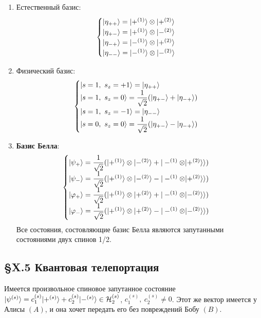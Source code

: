 \begin{enumerate}
	\item Естественный базис:
	\[
	\begin{cases}
		| \eta_{++} \rangle = | +^{(1)} \rangle\otimes| +^{(2)} \rangle\\
		| \eta_{+-} \rangle = | +^{(1)} \rangle\otimes| -^{(2)} \rangle\\
		| \eta_{-+} \rangle = | -^{(1)} \rangle\otimes| +^{(2)} \rangle\\
		| \eta_{--} \rangle = | -^{(1)} \rangle\otimes| -^{(2)} \rangle\\
	\end{cases}
	\]
	\item Физический базис: 
	\[
	\begin{cases}
		| s=1,~s_z=+1 \rangle = | \eta_{++} \rangle\\
		| s=1,~s_z=0 \rangle = \dfrac{1}{\sqrt{2}}(| \eta_{+-} \rangle + | \eta_{-+} \rangle)\\
		| s=1,~s_z=-1 \rangle = | \eta_{--} \rangle\\
		| s=0,~s_z=0 \rangle = \dfrac{1}{\sqrt{2}}(| \eta_{+-} \rangle - | \eta_{-+} \rangle)\\
	\end{cases}
	\]
	\item \textbf{Базис Белла}:
	\[
	\begin{cases}
		| \psi_+ \rangle = \dfrac{1}{\sqrt{2}}(| +^{(1)} \rangle\otimes| -^{(2)} \rangle + | -^{(1)}\otimes| +^{(2)} \rangle \rangle)\\
		| \psi_- \rangle = \dfrac{1}{\sqrt{2}}(| +^{(1)} \rangle\otimes| -^{(2)} \rangle - | -^{(1)}\otimes| +^{(2)} \rangle \rangle)\\
		| \varphi_+ \rangle = \dfrac{1}{\sqrt{2}}(| +^{(1)} \rangle\otimes| +^{(2)} \rangle + | -^{(1)}\otimes| -^{(2)} \rangle \rangle)\\
		| \varphi_- \rangle = \dfrac{1}{\sqrt{2}}(| +^{(1)} \rangle\otimes| +^{(2)} \rangle - | -^{(1)}\otimes| -^{(2)} \rangle \rangle)\\
	\end{cases}
	\]
	Все состояния, состовляющие базис Белла являются запутанными состояниями двух спинов 1/2.
\end{enumerate}




\subsection{\S X.5 Квантовая телепортация}
Имеется произвольное спиновое запутанное состояние $| \psi^{(s)} \rangle = c_1^{(s)}| +^{(s)} \rangle + c_2^{(s)}| -^{(s)} \rangle \in \mathcal{H}_2^{(s)}$, $c_1^{(s)},~c_2^{(s)} \neq 0$. Этот же вектор имеется у Алисы $(A)$, и она хочет передать его без повреждений Бобу $(B)$.\\

